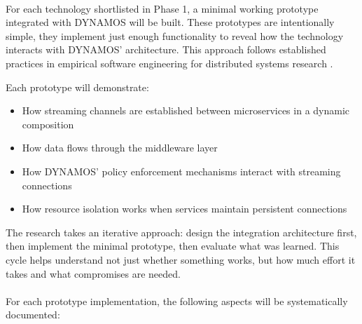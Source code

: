 \documentclass[a4paper,10pt,british]{scrartcl}
\begin{document}
\paragraph{}

For each technology shortlisted in Phase 1, a minimal working prototype integrated with DYNAMOS will be built. These prototypes are intentionally simple, they implement just enough functionality to reveal how the technology interacts with DYNAMOS' architecture. This approach follows established practices in empirical software engineering for distributed systems research \cite{Henning2021ScalabilityMetrics,fragkoulis2024survey}.

Each prototype will demonstrate:

\begin{itemize}
  \item How streaming channels are established between microservices in a dynamic composition
  \item How data flows through the middleware layer
  \item How DYNAMOS' policy enforcement mechanisms interact with streaming connections
  \item How resource isolation works when services maintain persistent connections
\end{itemize}

The research takes an iterative approach: design the integration architecture first, then implement the minimal prototype, then evaluate what was learned. This cycle helps understand not just whether something works, but how much effort it takes and what compromises are needed.

\paragraph{}

For each prototype implementation, the following aspects will be systematically documented:
\end{document}
